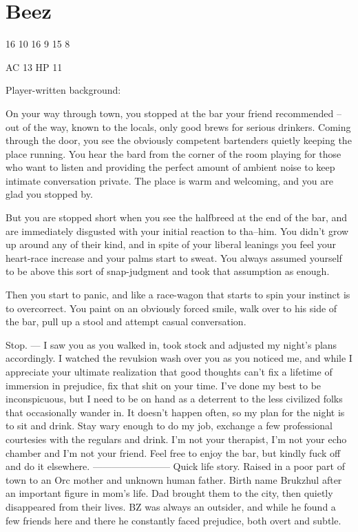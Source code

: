 \section{Beez}\label{sec:donovanDrappus}
   \medskip
{}

16
10
16
9
15
8

AC 13
HP 11

\hrulefill
Player-written background:

On your way through town, you stopped at the bar your friend recommended -- out of the way, known to the locals, only good brews for serious drinkers. Coming through the door, you see the obviously competent bartenders quietly keeping the place running. You hear the bard from the corner of the room playing for those who want to listen and providing the perfect amount of ambient noise to keep intimate conversation private. The place is warm and welcoming, and you are glad you stopped by.

But you are stopped short when you see the halfbreed at the end of the bar, and are immediately disgusted with your initial reaction to tha--him. You didn't grow up around any of their kind, and in spite of your liberal leanings you feel your heart-race increase and your palms start to sweat. You always assumed yourself to be above this sort of snap-judgment and took that assumption as enough.

Then you start to panic, and like a race-wagon that starts to spin your instinct is to overcorrect. You paint on an obviously forced smile, walk over to his side of the bar, pull up a stool and attempt casual conversation.

Stop.
---
I saw you as you walked in, took stock and adjusted my night’s plans accordingly. I watched the revulsion wash over you as you noticed me, and while I appreciate your ultimate realization that good thoughts can’t fix a lifetime of immersion in prejudice, fix that shit on your time. I’ve done my best to be inconspicuous, but I need to be on hand as a deterrent to the less civilized folks that occasionally wander in. It doesn’t happen often, so my plan for the night is to sit and drink. Stay wary enough to do my job, exchange a few professional courtesies with the regulars and drink. I’m not your therapist, I’m not your echo chamber and I’m not your friend. Feel free to enjoy the bar, but kindly fuck off and do it elsewhere.
------------------------
Quick life story. Raised in a poor part of town to an Orc mother and unknown human father. Birth name Brukzhul after an important figure in mom’s life. Dad brought them to the city, then quietly disappeared from their lives. BZ was always an outsider, and while he found a few friends here and there he constantly faced prejudice, both overt and subtle.

